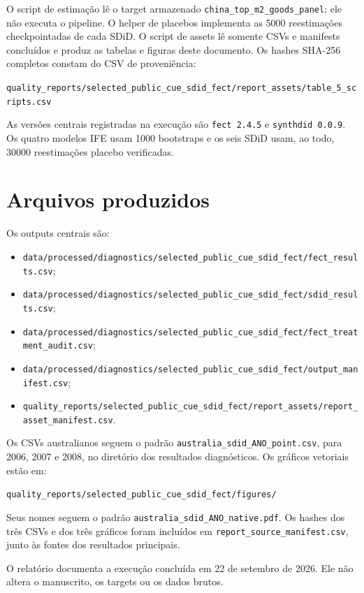 \documentclass[
  brazilian,
  11pt,
]{article}
\providecommand{\tightlist}{%
  \setlength{\itemsep}{0pt}\setlength{\parskip}{0pt}}
\begin{document}
O script de estimação lê o target armazenado
\texttt{china\_top\_m2\_goods\_panel}; ele não executa o pipeline. O
helper de placebos implementa as 5000 reestimações checkpointadas de
cada SDiD. O script de assets lê somente CSVs e manifests concluídos e
produz as tabelas e figuras deste documento. Os hashes SHA-256 completos
constam do CSV de proveniência:

\nolinkurl{quality_reports/selected_public_cue_sdid_fect/report_assets/table_5_scripts.csv}

As versões centrais registradas na execução são \texttt{fect 2.4.5} e
\texttt{synthdid 0.0.9}. Os quatro modelos IFE usam 1000 bootstraps e os
seis SDiD usam, ao todo, 30000 reestimações placebo verificadas.

\section{Arquivos produzidos}\label{arquivos-produzidos}

Os outputs centrais são:

\begin{itemize}
\tightlist
\item
  \nolinkurl{data/processed/diagnostics/selected_public_cue_sdid_fect/fect_results.csv};
\item
  \nolinkurl{data/processed/diagnostics/selected_public_cue_sdid_fect/sdid_results.csv};
\item
  \nolinkurl{data/processed/diagnostics/selected_public_cue_sdid_fect/fect_treatment_audit.csv};
\item
  \nolinkurl{data/processed/diagnostics/selected_public_cue_sdid_fect/output_manifest.csv};
\item
  \nolinkurl{quality_reports/selected_public_cue_sdid_fect/report_assets/report_asset_manifest.csv}.
\end{itemize}

Os CSVs australianos seguem o padrão
\texttt{australia\_sdid\_ANO\_point.csv}, para 2006, 2007 e 2008, no
diretório dos resultados diagnósticos. Os gráficos vetoriais estão em:

\nolinkurl{quality_reports/selected_public_cue_sdid_fect/figures/}

Seus nomes seguem o padrão \texttt{australia\_sdid\_ANO\_native.pdf}. Os
hashes dos três CSVs e dos três gráficos foram incluídos em
\texttt{report\_source\_manifest.csv}, junto às fontes dos resultados
principais.

O relatório documenta a execução concluída em 22 de setembro de 2026.
Ele não altera o manuscrito, os targets ou os dados brutos.
\end{document}
